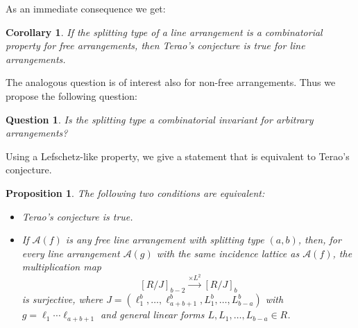 \documentclass[12pt]{amsart}
\numberwithin{equation}{section}
\newtheorem{proposition}[theorem]{Proposition}
\newtheorem{corollary}[theorem]{Corollary}
\newtheorem{question}[theorem]{Question}
\theoremstyle{definition}
\begin{document}
As an immediate consequence we get: 

\begin{corollary} 
     \label{cor:type of free comb}
If the splitting type of a line arrangement is a combinatorial property  for free arrangements, then Terao's conjecture is true for line arrangements. 
\end{corollary} 

The analogous question is of interest also for non-free arrangements. Thus we propose the following question:

\begin{question}
Is the splitting type a combinatorial invariant for arbitrary arrangements?
\end{question}

Using a Lefschetz-like property, we give a statement that is equivalent to  Terao's conjecture. 

\begin{proposition} 
   \label{prop:Terao equiv} 
The following two conditions are equivalent: 
\begin{itemize}

\item[(a)] Terao's conjecture is true. 

\item[(b)] If ${\mathcal{A}} (f)$ is any free line arrangement with splitting type $(a, b)$, then, for every line arrangement ${\mathcal{A}} (g)$ with the same incidence lattice as ${\mathcal{A}} (f)$, the multiplication map 
\[
[R/J]_{b-2} \stackrel{\times L^2}{\longrightarrow} [R/J]_b
\]
is surjective, where $J = (\ell_1^b,\dots, \ell_{a+b+1}^b, L_1^b,\ldots,L_{b-a}^b)$ with $g = \ell_1 \cdots \ell_{a+b+1}$ and general linear forms $L, L_1,\ldots,L_{b-a} \in R$. 
\end{itemize}
\end{proposition} 
\end{document}
